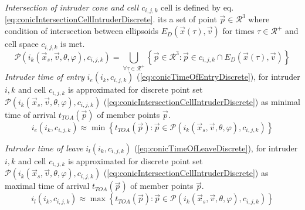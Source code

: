 \noindent \emph{Intersection of intruder cone and cell $c_{i,j,k}$} cell is defined by eq. \ref{eq:conicIntersectionCellIntruderDiscrete}. its a set of point $\vec{p}\in\mathscr{R}^3$ where condition of intersection between ellipsoids $E_D(\vec{x}(\tau),\vec{v})$ for times $\tau\in\mathscr{R}^+$ and cell space $c_{i,j,k}$ is met.
\begin{equation}\label{eq:conicIntersectionCellIntruderDiscrete}
    \mathscr{P}(i_k(\vec{x}_s,\vec{v},\theta,\varphi),c_{i,j,k})= \bigcup_{\forall \tau\in\mathscr{R}^+} \left\{\vec{p}\in\mathscr{R}^3:\vec{p}\in c_{i,j,k}\cap E_D(\vec{x}(\tau),\vec{v})\right\}
\end{equation}
\noindent\emph{Intruder time of entry} $i_e(i_k,c_{i,j,k})$ (\ref{eq:conicTimeOfEntryDiscrete}), for intruder $i,k$ and cell $c_{i,j,k}$ is approximated for discrete point set  $\mathscr{P}(i_k(\vec{x}_s,\vec{v},\theta,\varphi),c_{i,j,k})$ (\ref{eq:conicIntersectionCellIntruderDiscrete}) as minimal time of arrival $t_{TOA}(\vec{p})$ of member points $\vec{p}$.
\begin{equation}\label{eq:conicTimeOfEntryDiscrete}
    i_e(i_k,c_{i,j,k})\approx \min \left\{t_{TOA}(\vec{p}):\vec{p}\in\mathscr{P}(i_k(\vec{x}_s,\vec{v},\theta,\varphi),c_{i,j,k})\right\}
\end{equation}

\noindent\emph{Intruder time of leave} $i_l(i_k,c_{i,j,k})$ (\ref{eq:conicTimeOfLeaveDiscrete}), for intruder $i,k$ and cell $c_{i,j,k}$ is approximated for discrete point set  $\mathscr{P}(i_k(\vec{x}_s,\vec{v},\theta,\varphi),c_{i,j,k})$ (\ref{eq:conicIntersectionCellIntruderDiscrete}) as maximal time of arrival $t_{TOA}(\vec{p})$ of member points $\vec{p}$.
\begin{equation}\label{eq:conicTimeOfLeaveDiscrete}
    i_l(i_k,c_{i,j,k})\approx \max \left\{t_{TOA}(\vec{p}):\vec{p}\in\mathscr{P}(i_k(\vec{x}_s,\vec{v},\theta,\varphi),c_{i,j,k})\right\}
\end{equation}

